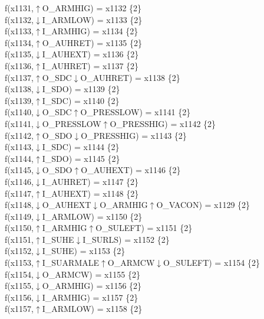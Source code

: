 f(x1131,$\uparrow$O\_ARMHIG) = x1132 \{2\} \\  
f(x1132,$\downarrow$I\_ARMLOW) = x1133 \{2\} \\  
f(x1133,$\uparrow$I\_ARMHIG) = x1134 \{2\} \\  
f(x1134,$\uparrow$O\_AUHRET) = x1135 \{2\} \\  
f(x1135,$\downarrow$I\_AUHEXT) = x1136 \{2\} \\  
f(x1136,$\uparrow$I\_AUHRET) = x1137 \{2\} \\  
f(x1137,$\uparrow$O\_SDC$\downarrow$O\_AUHRET) = x1138 \{2\} \\  
f(x1138,$\downarrow$I\_SDO) = x1139 \{2\} \\  
f(x1139,$\uparrow$I\_SDC) = x1140 \{2\} \\  
f(x1140,$\downarrow$O\_SDC$\uparrow$O\_PRESSLOW) = x1141 \{2\} \\  
f(x1141,$\downarrow$O\_PRESSLOW$\uparrow$O\_PRESSHIG) = x1142 \{2\} \\  
f(x1142,$\uparrow$O\_SDO$\downarrow$O\_PRESSHIG) = x1143 \{2\} \\  
f(x1143,$\downarrow$I\_SDC) = x1144 \{2\} \\  
f(x1144,$\uparrow$I\_SDO) = x1145 \{2\} \\  
f(x1145,$\downarrow$O\_SDO$\uparrow$O\_AUHEXT) = x1146 \{2\} \\  
f(x1146,$\downarrow$I\_AUHRET) = x1147 \{2\} \\  
f(x1147,$\uparrow$I\_AUHEXT) = x1148 \{2\} \\  
f(x1148,$\downarrow$O\_AUHEXT$\downarrow$O\_ARMHIG$\uparrow$O\_VACON) = x1129 \{2\} \\  
f(x1149,$\downarrow$I\_ARMLOW) = x1150 \{2\} \\  
f(x1150,$\uparrow$I\_ARMHIG$\uparrow$O\_SULEFT) = x1151 \{2\} \\  
f(x1151,$\uparrow$I\_SUHE$\downarrow$I\_SURLS) = x1152 \{2\} \\  
f(x1152,$\downarrow$I\_SUHE) = x1153 \{2\} \\  
f(x1153,$\uparrow$I\_SUARMALE$\uparrow$O\_ARMCW$\downarrow$O\_SULEFT) = x1154 \{2\} \\  
f(x1154,$\downarrow$O\_ARMCW) = x1155 \{2\} \\  
f(x1155,$\downarrow$O\_ARMHIG) = x1156 \{2\} \\  
f(x1156,$\downarrow$I\_ARMHIG) = x1157 \{2\} \\  
f(x1157,$\uparrow$I\_ARMLOW) = x1158 \{2\} \\  
